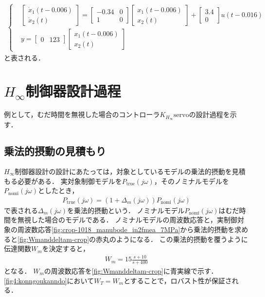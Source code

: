 \begin{align}
	\begin{cases}
		&\begin{bmatrix}
			\dot{x}_1(t-0.006)\\
			\dot{x}_2(t)
		\end{bmatrix}
		=
		\begin{bmatrix}
			-0.34 & 0\\
			1 & 0
		\end{bmatrix}
		\begin{bmatrix}
			x_1(t-0.006)\\
			x_2(t)
		\end{bmatrix}
		+
		\begin{bmatrix}
			3.4\\
			0
		\end{bmatrix}
		u(t-0.016) \\[10pt]
		&y =
		\begin{bmatrix}	
			0 & 123
		\end{bmatrix}
		\begin{bmatrix}
			x_1(t-0.006)\\
			x_2(t)
		\end{bmatrix}		
	\end{cases}
	\label{eqn:ss_inputTOfmea}
\end{align}
と表される．

\section{$H_\infty$制御器設計過程}
\label{sec:Hinfty_sekkei}
例として，むだ時間を無視した場合のコントローラ$K_{H_\infty}\mathrm{servo}$の設計過程を示す．
\subsection{乗法的摂動の見積もり}
$H_\infty$制御器設計の設計にあたっては，対象としているモデルの乗法的摂動を見積もる必要がある．
実対象制御モデルを$P_\mathrm{true}(j\omega)$，そのノミナルモデルを$P_\mathrm{nomi}(j\omega)$としたとき，
\begin{align}
    P_\mathrm{true}(j\omega)= (1+\Delta_m(j\omega))P_\mathrm{nomi}(j\omega)
\end{align}
で表される$\Delta_m(j\omega)$を乗法的摂動という．
ノミナルモデル$P_\mathrm{nomi}(j\omega)$はむだ時間を無視した場合のモデルである．
ノミナルモデルの周波数応答と，実制御対象の周波数応答\figname\ref{fig:crop-1018_manubode_in2fmea_7MPa}から乗法的摂動を求めると\figname\ref{fig:Wmanddeltam-crop}の赤丸のようになる．
この乗法的摂動を覆うように伝達関数$W_m$を決定すると，
\begin{align}
    W_m = 15\frac{s+10}{s+400}
\end{align}
となる．
$W_m$の周波数応答を\figname\ref{fig:Wmanddeltam-crop}に青実線で示す．
\figname\ref{fig4:konngoukanndo}において$W_T=W_m$とすることで，ロバスト性が保証される\cite{平田201703}．

